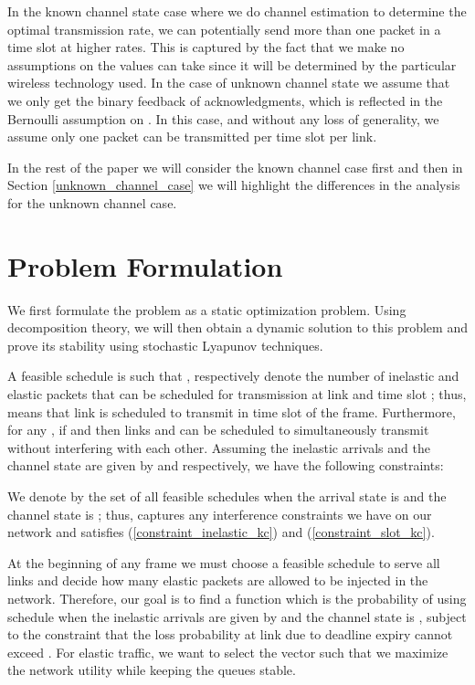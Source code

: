 \documentclass[conference]{IEEEtran}
\begin{document}
In the known channel state case where we do channel estimation to determine the optimal transmission rate, we can potentially send more than one packet in a time slot at higher rates. This is captured by the fact that we make no assumptions on the values  can take since it will be determined by the particular wireless technology used. In the case of unknown channel state we assume that we only get the binary feedback of acknowledgments, which is reflected in the Bernoulli assumption on . In this case, and without any loss of generality, we assume only one packet can be transmitted per time slot per link.

In the rest of the paper we will consider the known channel case first and then in Section \ref{unknown_channel_case} we will highlight the differences in the analysis for the unknown channel case.

\section{Problem Formulation}
\label{formulation_kc}

We first formulate the problem as a static optimization problem. Using decomposition theory, we will then obtain a dynamic solution to this problem and prove its stability using stochastic Lyapunov techniques.

A feasible schedule  is such that ,  respectively denote the number of inelastic and elastic packets that can be scheduled for transmission at link  and time slot ; thus,  means that link  is scheduled to transmit in time slot  of the frame. Furthermore, for any , if  and  then links  and  can be scheduled to simultaneously transmit without interfering with each other. Assuming the inelastic arrivals and the channel state are given by  and  respectively, we have the following constraints:


We denote by  the set of all feasible schedules when the arrival state is  and the channel state is ; thus,  captures any interference constraints we have on our network and satisfies (\ref{constraint_inelastic_kc}) and (\ref{constraint_slot_kc}).

At the beginning of any frame we must choose a feasible schedule to serve all links and decide how many elastic packets are allowed to be injected in the network. Therefore, our goal is to find a function  which is the probability of using schedule  when the inelastic arrivals are given by  and the channel state is , subject to the constraint that the loss probability at link  due to deadline expiry cannot exceed . For elastic traffic, we want to select the vector  such that we maximize the network utility while keeping the queues stable.
\end{document}
